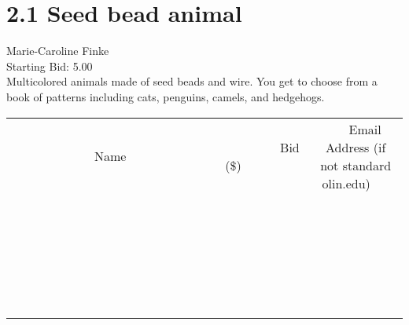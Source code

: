 \documentclass[11pt]{article}
\begin{document}
					\section*{2.1 Seed bead animal}
					Marie-Caroline Finke \\
					Starting Bid: 5.00 \\
					Multicolored animals made of seed beads and wire. You get to choose from a book of patterns including cats, penguins, camels, and hedgehogs. \\
					[6ex]
					\begin{tabular}{c c c}
						~~~~~~~~~~~~~Name~~~~~~~~~~~~~ & ~~~~~~~~~Bid (\$)~~~~~~~~~ & ~~~Email Address (if not standard olin.edu)~~~ \\
				
 & & \\
\hline
 & & \\
\hline
 & & \\
\hline
 & & \\
\hline
 & & \\
\hline
 & & \\
\hline
 & & \\
\hline
 & & \\
\hline
 & & \\
\hline
 & & \\
\hline
 & & \\
\hline
 & & \\
\hline
 & & \\
\hline
 & & \\
\hline
 & & \\
\hline
 & & \\
\hline
 & & \\
\hline
 & & \\
\hline
 & & \\
\hline
 & & \\
\hline
 & & \\
\hline
 & & \\
\hline
 & & \\
\hline
 & & \\
\hline
 & & \\
\hline
 & & \\
\hline
					\end{tabular}
					\clearpage
				
\end{document}
